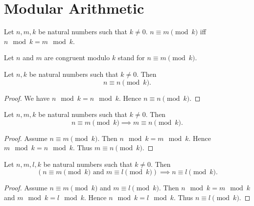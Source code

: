 \documentclass[10pt]{article}
\begin{document}
  \section{Modular Arithmetic}

  \begin{forthel}
    \begin{definition}
      Let $n, m, k$ be natural numbers such that $k \neq 0$.
      $n \equiv m \pmod{k}$ iff $n \mod k = m \mod k$.
    \end{definition}

    Let $n$ and $m$ are congruent modulo $k$ stand for $n \equiv m \pmod{k}$.
  \end{forthel}

  \begin{forthel}
    \begin{proposition}
      Let $n, k$ be natural numbers such that $k \neq 0$.
      Then \[ n \equiv n \pmod{k}. \]
    \end{proposition}
    \begin{proof}
      We have $n \mod k = n \mod k$.
      Hence $n \equiv n \pmod{k}$.
    \end{proof}
  \end{forthel}

  \begin{forthel}
    \begin{proposition}
      Let $n, m, k$ be natural numbers such that $k \neq 0$.
      Then \[ n \equiv m \pmod{k} \implies m \equiv n \pmod{k}. \]
    \end{proposition}
    \begin{proof}
      Assume $n \equiv m \pmod{k}$.
      Then $n \mod k = m \mod k$.
      Hence $m \mod k = n \mod k$.
      Thus $m \equiv n \pmod{k}$.
    \end{proof}
  \end{forthel}

  \begin{forthel}
    \begin{proposition}
      Let $n, m, l, k$ be natural numbers such that $k \neq 0$.
      Then \[ (\text{$n \equiv m \pmod{k}$ and $m \equiv l \pmod{k}$}) \implies
      n \equiv l \pmod{k}. \]
    \end{proposition}
    \begin{proof}
      Assume $n \equiv m \pmod{k}$ and $m \equiv l \pmod{k}$.
      Then $n \mod k = m \mod k$ and $m \mod k = l \mod k$.
      Hence $n \mod k = l \mod k$.
      Thus $n \equiv l \pmod{k}$.
    \end{proof}
  \end{forthel}
\end{document}
